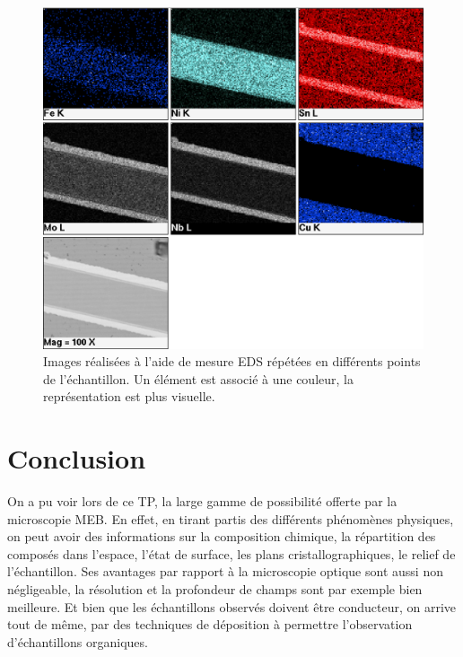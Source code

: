 \documentclass[a4paper,12pt]{article}
\begin{document}
\begin{figure}
\centering
\includegraphics[width=\textwidth]{images/im5.png}
\caption{Images réalisées à l'aide de mesure EDS répétées en différents points de l'échantillon. Un élément est associé à une couleur, la représentation est plus visuelle.}
\label{fig:eds}
\end{figure}





\section*{Conclusion}


On a pu voir lors de ce TP, la large gamme de possibilité offerte par la microscopie MEB. En effet, en tirant partis des différents phénomènes physiques, on peut avoir des informations sur la composition chimique, la répartition des composés dans l'espace, l'état de surface, les plans cristallographiques, le relief de l'échantillon. Ses avantages par rapport à la microscopie optique sont aussi non négligeable, la résolution et la profondeur de champs sont par exemple bien meilleure. Et bien que les échantillons observés doivent être conducteur, on arrive tout de même, par des techniques de déposition à permettre l'observation d'échantillons organiques.
\end{document}
